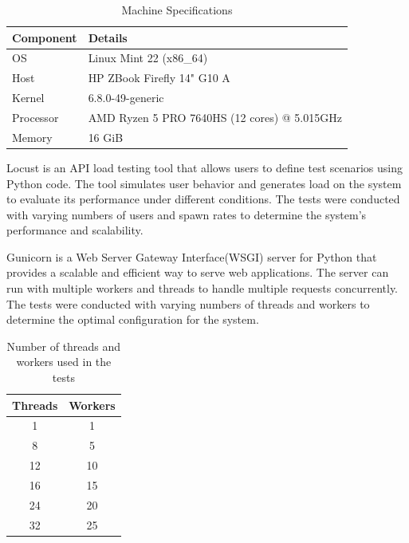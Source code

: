\documentclass[cic,tc,english]{iiufrgs}
\begin{document}
        \begin{table}[h]
            \centering
            \begin{tabular}{|l|l|}
            \hline
            \textbf{Component} & \textbf{Details} \\ \hline
            OS & Linux Mint 22 (x86\_64) \\ \hline
            Host & HP ZBook Firefly 14" G10 A \\ \hline
            Kernel & 6.8.0-49-generic \\ \hline
            Processor & AMD Ryzen 5 PRO 7640HS (12 cores) @ 5.015GHz \\ \hline
            Memory & 16 GiB \\ \hline
            \end{tabular}
            \caption{Machine Specifications}
            \label{tab:machine_specs}
        \end{table}

        Locust is an API load testing tool that allows users to define test scenarios using Python code. The tool simulates user behavior and generates load on the system to evaluate its performance under different conditions. The tests were conducted with varying numbers of users and spawn rates to determine the system's performance and scalability.
        
        Gunicorn is a Web Server Gateway Interface(WSGI) server for Python that provides a scalable and efficient way to serve web applications. The server can run with multiple workers and threads to handle multiple requests concurrently. The tests were conducted with varying numbers of threads and workers to determine the optimal configuration for the system.

        \begin{table}
            \centering
            \begin{tabular}{|c|c|}
                \hline
                \textbf{Threads} & \textbf{Workers} \\ \hline
                1 & 1 \\ \hline
                8 & 5 \\ \hline
                12 & 10 \\ \hline
                16 & 15 \\ \hline
                24 & 20 \\ \hline    
                32 & 25 \\ \hline
            \end{tabular}
            \caption{Number of threads and workers used in the tests}
            \label{tab:threads_workers}
        \end{table}
        
\end{document}
